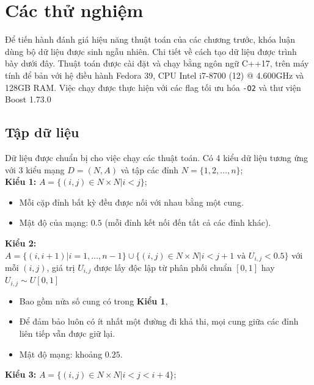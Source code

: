 \documentclass[../main.tex]{subfiles}
\begin{document}
\chapter{Các thử nghiệm}\label{cuxe1c-thux1eed-nghiux1ec7m}

Để tiến hành đánh giá hiệu năng thuật toán của các chương trước, khóa luận dùng bộ dữ liệu được sinh ngẫu nhiên. 
Chi tiết về cách tạo dữ liệu được trình bày dưới đây.
Thuật toán được cài đặt và
chạy bằng ngôn ngữ C++17, trên máy tính để bản với hệ điều hành Fedora
39, CPU Intel i7-8700 (12) @ 4.600GHz và 128GB RAM. Việc chạy được thực hiện
với các flag tối ưu hóa \texttt{-O2} và thư viện Boost 1.73.0



\section{Tập dữ liệu}\label{tux1eadp-dux1eef-liux1ec7u}

Dữ liệu được chuẩn bị cho việc chạy các thuật toán. Có 4 kiểu dữ liệu
tương ứng với 3 kiểu mạng \(D=(N,A)\) và tập các đỉnh
\(N =\{1,2,\dots, n\}\);\\
\textbf{Kiểu 1:} \(A = \{(i, j) \in N \times N | i < j \}\);

  \begin{itemize}
    \tightlist
    \item
      Mỗi cặp đỉnh bất kỳ đều được nối với nhau bằng một cung.
    \item
      Mật độ của mạng: \(0.5\) (mỗi đỉnh kết nối đến tất cả các đỉnh khác).
    \end{itemize}
\textbf{Kiểu 2:}
  \(A = \{(i, i+1) | i = 1, \dots, n-1\} \cup \{(i, j) \in N \times N | i < j + 1 \text{ và } U_{i, j} < 0.5\}\)
  với mỗi \((i, j)\), giá trị \(U_{i, j}\) được lấy độc lập từ phân phối
  chuẩn \([0, 1]\) hay \(U_{i, j} \sim U[0,1]\)

  \begin{itemize}
    \tightlist
    \item
      Bao gồm nửa số cung có trong \textbf{Kiểu 1},
    \item
      Để đảm bảo luôn có ít nhất một đường đi khả thi, mọi cung giữa các
      đỉnh liên tiếp vẫn được giữ lại.
    \item
      Mật độ mạng: khoảng \(0.25\).
    \end{itemize}
\textbf{Kiểu 3:} \(A = \{(i, j) \in N \times N | i < j < i + 4 \}\);
\end{document}
